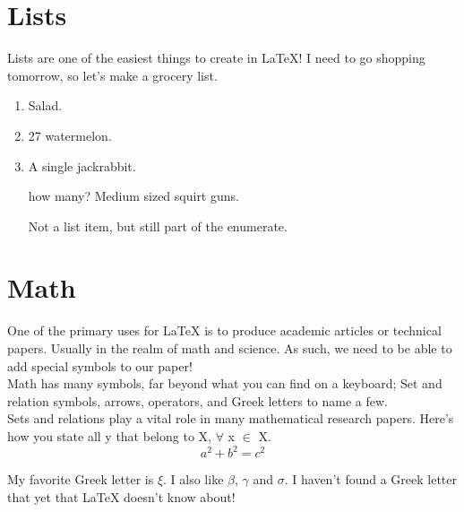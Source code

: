 \documentclass[12pt]{article}
\begin{document}
\section{Lists}
Lists are one of the easiest things to create in LaTeX! I need to go shopping
tomorrow, so let's make a grocery list.
\begin{enumerate} %
  \item Salad.
  \item 27 watermelon.
  \item A single jackrabbit.
  \item[how many?] Medium sized squirt guns.

  Not a list item, but still part of the enumerate.

\end{enumerate} %

\section{Math}

One of the primary uses for LaTeX is to produce academic articles or 
technical papers. Usually in the realm of math and science. As such, 
we need to be able to add special symbols to our paper! \\

Math has many symbols, far beyond what you can find on a keyboard;
Set and relation symbols, arrows, operators, and Greek letters to name a few.\\

Sets and relations play a vital role in many mathematical research papers.
Here's how you state all y that belong to X, $\forall$ x $\in$ X. \\

\[a^2 + b^2 = c^2 \]

My favorite Greek letter is $\xi$. I also like $\beta$, $\gamma$ and $\sigma$.
I haven't found a Greek letter that yet that LaTeX doesn't know about!
\end{document}
